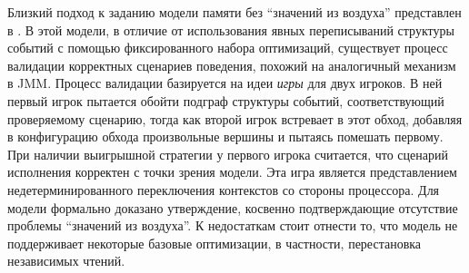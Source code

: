 Близкий подход к заданию модели памяти без ``значений из воздуха'' представлен в \cite{Jeffrey-Riely:LICS16}.
В этой модели, в отличие от использования явных переписываний структуры событий с помощью фиксированного
набора оптимизаций, существует процесс валидации корректных сценариев поведения, похожий на аналогичный
механизм в JMM. Процесс валидации базируется на идеи \emph{игры} для двух игроков.
В ней первый игрок пытается обойти подграф структуры событий, соответствующий проверяемому сценарию,
тогда как второй игрок встревает в этот обход, добавляя в конфигурацию обхода произвольные вершины
и пытаясь помешать первому.
При наличии выигрышной стратегии у первого игрока считается, что сценарий исполнения корректен с точки зрения
модели.
Эта игра является представлением недетерминированного переключения контекстов со стороны процессора.
Для модели формально доказано утверждение, косвенно подтверждающие отсутствие проблемы ``значений из воздуха''.
К недостаткам стоит отнести то, что модель не поддерживает некоторые базовые оптимизации, в частности, 
перестановка независимых чтений.


